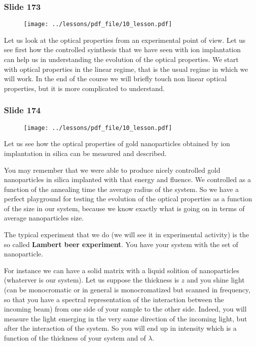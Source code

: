 \documentclass[../main/main.tex]{subfiles}
\begin{document}
\newpage

\subsubsection{Slide 173}

\begin{figure}[h!]
\centering
\texttt{[image: ../lessons/pdf\_file/10\_lesson.pdf]}
\end{figure}

Let us look at the optical properties from an experimental point of view. Let us see first how the controlled syinthesis that we have seen with ion implantation can help us in understanding the evolution of the optical properties.
We start with optical properties in the linear regime, that is the usual regime in which we will work. In the end of the course we will briefly touch non linear optical properties, but it is more complicated to understand.

\newpage

\subsubsection{Slide 174}

\begin{figure}[h!]
\centering
\texttt{[image: ../lessons/pdf\_file/10\_lesson.pdf]}
\end{figure}

Let us see how the optical properties of gold nanoparticles obtained by ion implantation in silica can be measured and described.

You may remember that we were able to produce nicely controlled gold nanoparticles in silica implanted with that energy and fluence. We controlled as a function of the annealing time the average radius of the system. So we have a perfect playground for testing the evolution of the optical properties as a function of the size in our system, because we know exactly what is going on in terms of average nanoparticles size.

The typical experiment that we do (we will see it in experimental activity) is the so called \textbf{Lambert beer experiment}. You have your system with the set of nanoparticle.

For instance we can have a solid matrix with a liquid solition of nanoparticles (whaterver is our system). Let us suppose the thickness is \( z \) and you shine light (can be monocromatic or in general is monocromatized but scanned in frequency, so that you have a spectral representation of the interaction between the incoming beam) from one side of your sample to the other side. Indeed, you will measure the light emerging in the very same direction of the incoming light, but after the interaction of the system. So you will end up in intensity which is a function of the thickness of your system and of \( \lambda  \).
\end{document}
